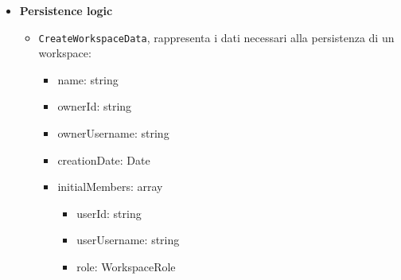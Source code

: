 \documentclass[a4paper, 11pt]{article}
\newcounter{subsubsubsection}[subsubsection]
\newcounter{subsubsubsubsection}[subsubsubsection]
\begin{document}
\begin{itemize}
  \item \textbf{Persistence logic}
    \begin{itemize}
      \item \texttt{CreateWorkspaceData}, rappresenta i dati necessari alla persistenza di un workspace:
        \begin{itemize}
          \item name: string
          \item ownerId: string
          \item ownerUsername: string
          \item creationDate: Date
          \item initialMembers: array
            \begin{itemize}
              \item userId: string
              \item userUsername: string
              \item role: WorkspaceRole
            \end{itemize}
        \end{itemize}
    \end{itemize}
\end{itemize}
\end{document}
